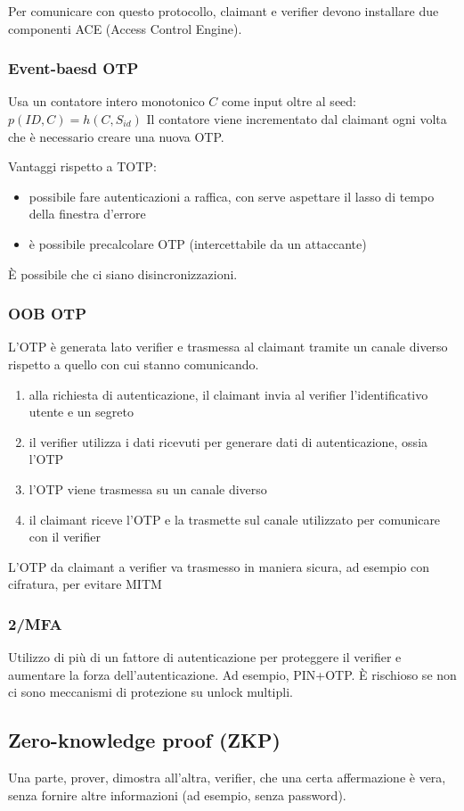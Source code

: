 \documentclass[11pt]{article}
\begin{document}
Per comunicare con questo protocollo, claimant e verifier devono installare due componenti ACE (Access Control Engine).
\subsubsection{Event-baesd OTP}
Usa un contatore intero monotonico $C$ come input oltre al seed: $p(ID, C)=h(C,S_{id})$
Il contatore viene incrementato dal claimant ogni volta che è necessario creare una nuova OTP.

Vantaggi rispetto a TOTP:
\begin{itemize}
    \item possibile fare autenticazioni a raffica, con serve aspettare il lasso di tempo della finestra d'errore 
    \item è possibile precalcolare OTP (intercettabile da un attaccante)
\end{itemize}
È possibile che ci siano disincronizzazioni.
\subsubsection{OOB OTP}
L'OTP è generata lato verifier e trasmessa al claimant tramite un canale diverso rispetto a quello con cui stanno comunicando.
\begin{enumerate}
    \item alla richiesta di autenticazione, il claimant invia al verifier l'identificativo utente e un segreto
    \item il verifier utilizza i dati ricevuti per generare dati di autenticazione, ossia l'OTP 
    \item l'OTP viene trasmessa su un canale diverso
    \item il claimant riceve l'OTP e la trasmette sul canale utilizzato per comunicare con il verifier 
\end{enumerate}
L'OTP da claimant a verifier va trasmesso in maniera sicura, ad esempio con cifratura, per evitare MITM
\subsubsection{2/MFA}
Utilizzo di più di un fattore di autenticazione per proteggere il verifier e aumentare la forza dell'autenticazione. Ad 
esempio, PIN+OTP. È rischioso se non ci sono meccanismi di protezione su unlock multipli.
\subsection{Zero-knowledge proof (ZKP)}
Una parte, prover, dimostra all'altra, verifier, che una certa affermazione è vera, senza fornire altre informazioni (ad 
esempio, senza password).
\end{document}
